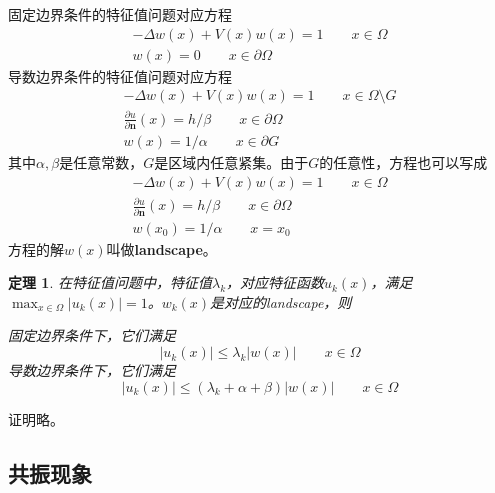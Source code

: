 \documentclass[12pt,a4paper]{article}
\newtheorem{theorem}{定理}
\begin{document}
固定边界条件的特征值问题对应方程
\begin{eqnarray}
- \Delta w(x) + V(x) w(x) = 1 \qquad x \in \Omega \\
w(x) = 0 \qquad x \in \partial \Omega
\end{eqnarray}
导数边界条件的特征值问题对应方程
\begin{eqnarray}
- \Delta w(x) + V(x) w(x) = 1 \qquad x \in \Omega \setminus G \\
\frac{\partial u}{\partial \mathbf{n}}(x) = h / \beta \qquad x \in \partial \Omega \\
w(x) = 1 / \alpha \qquad x \in \partial G
\end{eqnarray}
其中$\alpha,\beta$是任意常数，$G$是区域内任意紧集。由于$G$的任意性，方程也可以写成
\begin{eqnarray}
- \Delta w(x) + V(x) w(x) = 1 \qquad x \in \Omega \\
\frac{\partial u}{\partial \mathbf{n}}(x) = h / \beta \qquad x \in \partial \Omega \\
w(x_0) = 1 / \alpha \qquad x = x_0
\end{eqnarray}
方程的解$w(x)$叫做\textbf{landscape}。

\begin{theorem}

在特征值问题中，特征值$\lambda_k$，对应特征函数$u_k(x)$，满足$\max_{x \in \Omega} |u_k(x)| = 1$。$w_k(x)$是对应的landscape，则

固定边界条件下，它们满足
\begin{equation}
|u_k(x)| \leq \lambda_k |w(x)| \qquad x \in \Omega
\end{equation}
导数边界条件下，它们满足
\begin{equation}
|u_k(x)| \leq (\lambda_k + \alpha + \beta) |w(x)| \qquad x \in \Omega
\end{equation}

\end{theorem}

证明略。

\subsection{共振现象}
\end{document}
